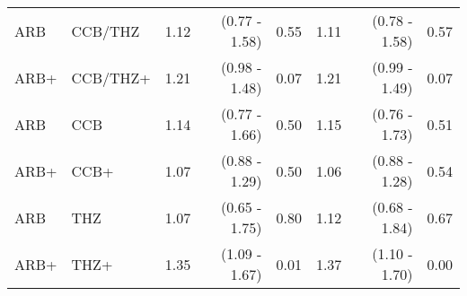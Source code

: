 \documentclass[11pt,]{article}
\begin{document}
\begin{table}[H]
{\begin{tabular}{llrrrrrr}
  ARB & CCB/THZ & 1.12 & (0.77 - 1.58) & 0.55 & 1.11 & (0.78 - 1.58) & 0.57 \\ 
  ARB+ & CCB/THZ+ & 1.21 & (0.98 - 1.48) & 0.07 & 1.21 & (0.99 - 1.49) & 0.07 \\ 
  ARB & CCB & 1.14 & (0.77 - 1.66) & 0.50 & 1.15 & (0.76 - 1.73) & 0.51 \\ 
  ARB+ & CCB+ & 1.07 & (0.88 - 1.29) & 0.50 & 1.06 & (0.88 - 1.28) & 0.54 \\ 
  ARB & THZ & 1.07 & (0.65 - 1.75) & 0.80 & 1.12 & (0.68 - 1.84) & 0.67 \\ 
  ARB+ & THZ+ & 1.35 & (1.09 - 1.67) & 0.01 & 1.37 & (1.10 - 1.70) & 0.00 \\ 
    \bottomrule
  \end{tabular}
  }
\end{table}
\begin{table}[H]
 \caption{Risk estimates for COVID-19 hospitalization across propensity score stratifed, prevalent-user cohorts in the VA-OMOP data source. We report uncalibrated and calibrated hazard ratios (HRs) and their 95\% confidence intervals (CIs). (+) indicates in-combination cohorts.}
\end{table}
\end{document}
